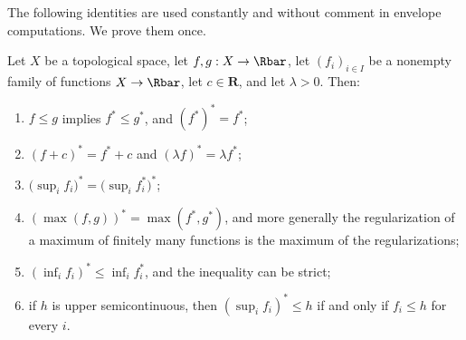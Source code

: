 The following identities are used constantly and without comment in envelope
computations.  We prove them once.

\begin{lemma}
\label{lem:usc-star-calculus}
Let $X$ be a topological space, let $f,g:X\to\Rbar$, let $(f_i)_{i\in I}$ be a
nonempty family of functions $X\to\Rbar$, let $c\in\mathbf R$, and let
$\lambda>0$.  Then:
\begin{enumerate}
\item $f\leq g$ implies $f^*\leq g^*$, and $(f^*)^*=f^*$;
\item $(f+c)^*=f^*+c$ and $(\lambda f)^*=\lambda f^*$;
\item $\bigl(\sup_if_i\bigr)^*=\bigl(\sup_if_i^*\bigr)^*$;
\item $(\max(f,g))^*=\max(f^*,g^*)$, and more generally the regularization of
  a maximum of finitely many functions is the maximum of the
  regularizations;
\item $(\inf_if_i)^*\leq\inf_if_i^*$, and the inequality can be strict;
\item if $h$ is upper semicontinuous, then $(\sup_i f_i)^*\leq h$ if and only
  if $f_i\leq h$ for every $i$.
\end{enumerate}
\par
\end{lemma}

